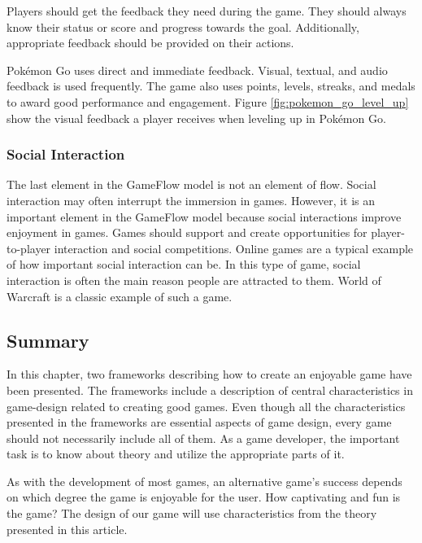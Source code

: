 \documentclass[../Main.tex]{subfiles}
\begin{document}
Players should get the feedback they need during the game. They should always know their status or score and progress towards the goal. Additionally, appropriate feedback should be provided on their actions. 

Pokémon Go uses direct and immediate feedback. Visual, textual, and audio feedback is used frequently. The game also uses points, levels, streaks, and medals to award good performance and engagement. Figure \ref{fig:pokemon_go_level_up} show the visual feedback a player receives when leveling up in Pokémon Go. 


\subsubsection{Social Interaction}
The last element in the GameFlow model is not an element of flow. Social interaction may often interrupt the immersion in games. However, it is an important element in the GameFlow model because social interactions improve enjoyment in games. Games should support and create opportunities for player-to-player interaction and social competitions. Online games are a typical example of how important social interaction can be. In this type of game, social interaction is often the main reason people are attracted to them. World of Warcraft is a classic example of such a game.

\subsection{Summary}
In this chapter, two frameworks describing how to create an enjoyable game have been presented. The frameworks include a description of central characteristics in game-design related to creating good games. Even though all the characteristics presented in the frameworks are essential aspects of game design, every game should not necessarily include all of them. As a game developer, the important task is to know about theory and utilize the appropriate parts of it.

As with the development of most games, an alternative game’s success depends on which degree the game is enjoyable for the user. How captivating and fun is the game? The design of our game will use characteristics from the theory presented in this article.

\biblio %
\end{document}
